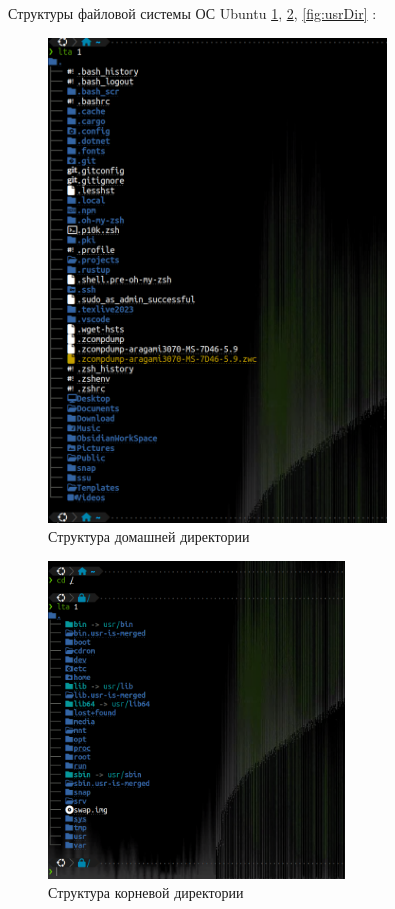 \newpage

Структуры файловой системы ОС Ubuntu \ref{fig:homeDir}, \ref{fig:korenDir}, \ref{fig:usrDir} :

\begin{figure}[!h]
    \centering
    \includegraphics[width = 0.8\textwidth]{images/homeDir.png}
    
    \caption{Структура домашней директории}
    
    \label{fig:homeDir}
\end{figure}

\begin{figure}[!h]
    \centering
    \includegraphics[width = 0.7\textwidth]{images/korenDir.png}
    
    \caption{Структура корневой директории}
    
    \label{fig:korenDir}
\end{figure}

